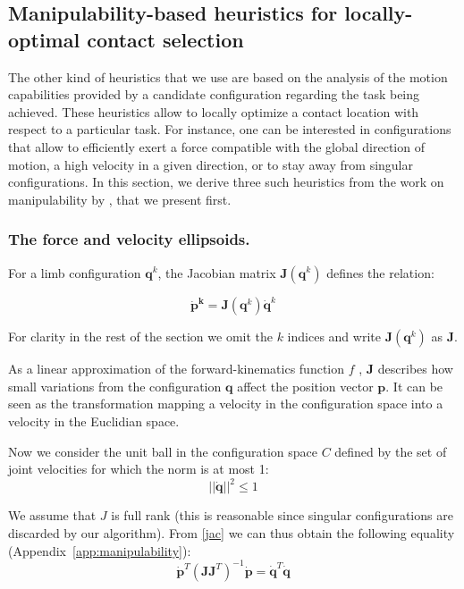 \subsection{Manipulability-based heuristics for locally-optimal contact selection}
The other kind of heuristics that we use are based on the analysis of the motion capabilities
provided by a candidate configuration regarding the task being achieved.
These heuristics allow to locally optimize a contact location with respect to a particular task.
For instance, one can be interested in configurations that allow to efficiently exert a force compatible with the global direction of motion,
a high velocity in a given direction, or to stay away from singular configurations.
In this section, we derive three such heuristics from the work on manipulability by \cite{Yoshikawa1984}, that we present first.

\subsubsection{The force and velocity ellipsoids.}
For a limb configuration $\mathbf{q}^k$, the Jacobian matrix
 $\mathbf{J}(\mathbf{q}^k)$   defines the relation:
 
\begin{equation} \label{jac}
\mathbf{\dot{p}^k} = \mathbf{J}(\mathbf{q}^k) \dot{\mathbf{q}}^k
\end{equation}

For clarity in the rest of the section we omit the $k$ indices and write $\mathbf{J}(\mathbf{q}^k)$ as $\mathbf{J}$.
 
As a linear approximation of the forward-kinematics function $f$ , $\mathbf{J}$ describes how small
variations from the configuration $\mathbf{q}$ affect the position vector $\mathbf{p}$.
It can be seen as the transformation mapping a velocity in the configuration space into a velocity in
the Euclidian space.

Now we consider the unit ball in the configuration space $C$ defined by the set of joint velocities
for which the norm is at most 1:
\begin{equation} \label{ball}
||\dot{\mathbf{q}}||^2 \leq 1
\end{equation}

We assume that $J$ is full rank (this is reasonable since singular configurations are discarded by our algorithm).
From \eqref{jac} we can thus obtain the following equality (Appendix~\ref{app:manipulability}):
\begin{equation} \label{jaceq}
\mathbf{\dot{p}}^T(\mathbf{J}\mathbf{J}^T)^{-1}\mathbf{\dot{p}} = \dot{\mathbf{q}}^T \dot{\mathbf{q}}
\end{equation}


